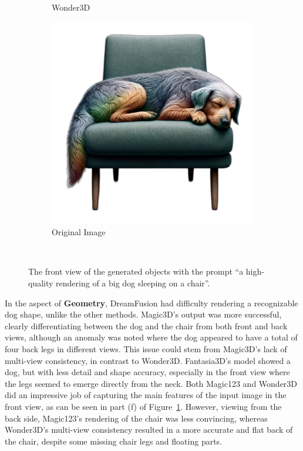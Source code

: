 \begin{figure}[ht]
\begin{subfigure}[b]{0.27\textwidth}
        \caption{Wonder3D}
        \vspace{0.1cm}
    \end{subfigure}
    \begin{subfigure}[b]{0.28\textwidth}
        \centering
        \includegraphics[width=\textwidth]{etc/Images/dog.png}
        \caption{Original Image}
        \vspace{0.1cm}
    \end{subfigure}
    \caption{The front view of the generated objects with the prompt ``a high-quality rendering of a big dog sleeping on a chair''.}~\label{fig:resultDogFront}
\end{figure}

In the aspect of \textbf{Geometry}, DreamFusion had difficulty rendering a recognizable dog shape, unlike the other methods. Magic3D's output was more successful, clearly differentiating between the dog and the chair from both front and back views, although an anomaly was noted where the dog appeared to have a total of four back legs in different views. This issue could stem from Magic3D's lack of multi-view consistency, in contrast to Wonder3D. Fantasia3D's model showed a dog, but with less detail and shape accuracy, especially in the front view where the legs seemed to emerge directly from the neck. Both Magic123 and Wonder3D did an impressive job of capturing the main features of the input image in the front view, as can be seen in part (f) of Figure~\ref{fig:resultDogFront}. However, viewing from the back side, Magic123's rendering of the chair was less convincing, whereas Wonder3D's multi-view consistency resulted in a more accurate and flat back of the chair, despite some missing chair legs and floating parts.\\


